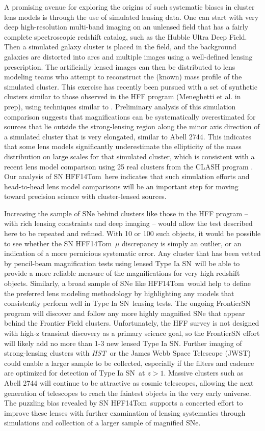 \documentclass[iop]{emulateapj}
\def\tomas{HFF14Tom}
\newcommand{\SNIa}{Type Ia SN}
\def\HST{{\it HST}}
\begin{document}
A promising avenue for exploring the origins of such systematic biases in
cluster lens models is through the use of simulated lensing data.  One
can start with very deep high-resolution multi-band imaging on an
unlensed field that has a fairly complete spectroscopic redshift
catalog, such as the Hubble Ultra Deep Field.  Then a simulated galaxy
cluster is placed in the field, and the background galaxies are
distorted into arcs and multiple images using a well-defined lensing
prescription.  The artificially lensed images can then be distributed
to lens modeling teams who attempt to reconstruct the (known) mass
profile of the simulated cluster.  This exercise has recently been
pursued with a set of synthetic clusters similar to those observed in
the HFF program (Meneghetti et al. in prep), using techniques
similar to \citet{Meneghetti:2010,Meneghetti:2014}.  Preliminary
analysis of this simulation comparison suggests that
magnifications can be systematically overestimated for
sources that lie outside the strong-lensing region along the minor
axis direction of a simulated cluster that is very
elongated, similar to Abell 2744.  This indicates that some
lens models significantly underestimate the ellipticity of the mass
distribution on large scales for that simulated cluster, which is
consistent with a recent lens model comparison using 25 real clusters
from the CLASH program \citep{Zitrin:2015}. Our analysis of
SN \tomas\ here indicates that such simulation efforts and
head-to-head lens model comparisons will be an important step for
moving toward precision science with cluster-lensed sources.  

Increasing the sample of SNe behind clusters like those in the HFF
program -- with rich lensing constraints and deep imaging -- would
allow the test described here to be repeated and refined.  With 10 or
100 such objects, it would be possible to see whether the SN \tomas\
$\mu$ discrepancy is simply an outlier, or an indication of a more
pernicious systematic error.  Any cluster that has been vetted by
pencil-beam magnification tests using lensed \SNIa\ will be able to
provide a more reliable measure of the magnifications for very high
redshift objects.  Similarly, a broad sample of SNe like \tomas\ would
help to define the preferred lens modeling methodology by highlighting
any models that consistently perform well in \SNIa\ lensing tests.
The ongoing FrontierSN program will discover and follow any more
highly magnified SNe that appear behind the Frontier Field
clusters. Unfortunately, the HFF survey is not designed with high-z
transient discovery as a primary science goal, so the FrontierSN
effort will likely add no more than 1-3 new lensed \SNIa. Further
imaging of strong-lensing clusters with \HST\ or the James Webb Space
Telescope (JWST) could enable a larger sample to be collected,
especially if the filters and cadence are optimized for detection
of \SNIa\ at $z>1$.  Massive clusters such as Abell 2744 will continue
to be attractive as cosmic telescopes, allowing the next generation of
telescopes to reach the faintest objects in the very early universe.
The puzzling bias revealed by SN \tomas\ supports a concerted effort
to improve these lenses with further examination of lensing
systematics through simulations and collection of a larger sample of
magnified SNe.
\end{document}
